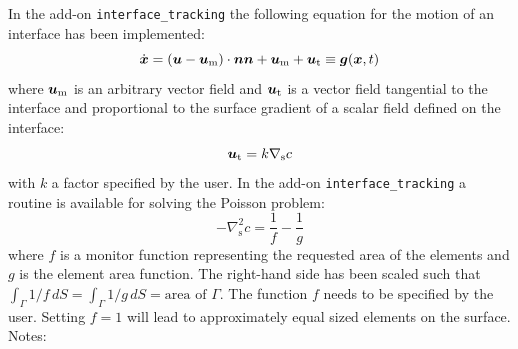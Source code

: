 In the add-on \texttt{interface\_tracking} the following equation for the
motion of an interface has been implemented:
\begin{equation}
   \dot{\boldsymbol{x}} = (\boldsymbol{u} - \boldsymbol{u}_\text{m})\cdot\boldsymbol{n}\boldsymbol{n} + \boldsymbol{u}_\text{m}
          + \boldsymbol{u}_\text{t} \equiv \boldsymbol{g}(\boldsymbol{x},t)
  \label{eq:dotx}
\end{equation}
where $\boldsymbol{u}_\text{m}$ is an arbitrary vector field and $\boldsymbol{u}_\text{t}$ is a
vector field tangential to the interface and proportional to the
surface gradient of a scalar field defined on the interface:
\begin{equation}
   \boldsymbol{u}_\text{t} = k \nabla_\text{s} c \label{eq:tang_motion}
\end{equation}
with $k$ a factor specified by the user. In the add-on
\texttt{interface\_tracking} a routine is available for solving the Poisson
problem:
\begin{equation}
   -\nabla_\text{s}^2 c = \dfrac1f-\dfrac1g \label{eq:poisson_surface}
\end{equation}
 where $f$ is a monitor function representing the requested area of the elements
 and $g$ is the element area function. The right-hand side has been
 scaled such that
 $\int_\Gamma 1/f\,dS=\int_\Gamma 1/g\,dS=\text{area of $\Gamma$}$.
The function $f$ needs to be 
specified by the user. Setting $f=1$ will lead to
approximately equal sized elements on the surface.
Notes:

